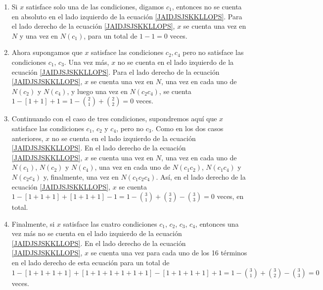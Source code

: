 \begin{myexample}
\begin{enumerate}[label=\arabic*)]
        \item Si $x$ satisface solo una de las condiciones, digamos $c_1$, entonces no se cuenta en absoluto en el lado izquierdo de la ecuación \eqref{JAIDJSJSKKLLOPS}. Para el lado derecho de la ecuación \eqref{JAIDJSJSKKLLOPS}, $x$ se cuenta una vez en $N$ y una vez en $N\left(c_1\right)$, para un total de $1-1=0$ veces.
        \item Ahora supongamos que $x$ satisface las condiciones $c_2, c_4$ pero no satisface las condiciones $c_1$, $c_3$. Una vez más, $x$ no se cuenta en el lado izquierdo de la ecuación \eqref{JAIDJSJSKKLLOPS}. Para el lado derecho de la ecuación \eqref{JAIDJSJSKKLLOPS}, $x$ se cuenta una vez en $N$, una vez en cada uno de $N\left(c_2\right)$ y $N\left(c_4\right)$, y luego una vez en $N\left(c_2 c_4\right)$, se cuenta $\displaystyle 1-[1+1]+1=1-\binom{2}{1} + \binom{2}{2} = 0 $ veces.
        \item Continuando con el caso de tres condiciones, supondremos aquí que $x$ satisface las condiciones $c_1$, $c_2$ y $c_4$, pero no $c_3$. Como en los dos casos anteriores, $x$ no se cuenta en el lado izquierdo de la ecuación \eqref{JAIDJSJSKKLLOPS}. En el lado derecho de la ecuación \eqref{JAIDJSJSKKLLOPS}, $x$ se cuenta una vez en $N$, una vez en cada uno de $N\left(c_1\right)$, $N\left(c_2\right)$ y $N\left( c_4\right)$, una vez en cada uno de $N\left(c_1 c_2\right)$, $N\left(c_1 c_4\right)$ y $N\left(c_2 c_4\right)$ y, finalmente, una vez en $N\left(c_1 c_2 c_4\right)$. Así, en el lado derecho de la ecuación \eqref{JAIDJSJSKKLLOPS}, $x$ se cuenta $\displaystyle 1-[1+1+1]+[1+1+1]-1=1-\binom{3}{1} + \binom{3}{2} - \binom{3}{3} = 0$ veces, en total.
        \item Finalmente, si $x$ satisface las cuatro condiciones $c_1$, $c_2$, $c_3$, $c_4$, entonces una vez más no se cuenta en el lado izquierdo de la ecuación \eqref{JAIDJSJSKKLLOPS}. En el lado derecho de la ecuación \eqref{JAIDJSJSKKLLOPS}, $x$ se cuenta una vez para cada uno de los 16 términos en el lado derecho de esta ecuación para un total de $\displaystyle 1-[1+1+1+1]+[1+1+1+1+1 +1]-[1+1+1+1]+1=1- \binom{3}{1} + \binom{3}{2} - \binom{3}{3} = 0$ veces.


\end{enumerate}
\end{myexample}
